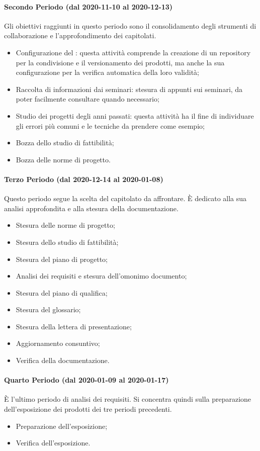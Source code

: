 \paragraph{Secondo Periodo (dal 2020-11-10 al 2020-12-13)}
Gli obiettivi raggiunti in questo periodo sono il consolidamento degli strumenti di collaborazione e l'approfondimento dei capitolati.
\begin{itemize}
	\item Configurazione del : questa attività comprende la creazione di un repository per la condivisione e il versionamento dei prodotti, ma anche la sua configurazione per la verifica automatica della loro validità;
	\item Raccolta di informazioni dai seminari: stesura di appunti sui seminari, da poter facilmente consultare quando necessario;
	\item Studio dei progetti degli anni passati: questa attività ha il fine di individuare gli errori più comuni e le tecniche da prendere come esempio;
	\item Bozza dello studio di fattibilità;
	\item Bozza delle norme di progetto.
\end{itemize}

\paragraph{Terzo Periodo (dal 2020-12-14 al 2020-01-08)}
Questo periodo segue la scelta del capitolato da affrontare. È dedicato alla sua analisi approfondita e alla stesura della documentazione. 
\begin{itemize}
	\item Stesura delle norme di progetto;
	\item Stesura dello studio di fattibilità;
	\item Stesura del piano di progetto;
	\item Analisi dei requisiti e stesura dell'omonimo documento;
	\item Stesura del piano di qualifica;
	\item Stesura del glossario;
	\item Stesura della lettera di presentazione;
	\item Aggiornamento consuntivo;
	\item Verifica della documentazione.
\end{itemize}

\paragraph{Quarto Periodo (dal 2020-01-09 al 2020-01-17)}
È l'ultimo periodo di analisi dei requisiti. Si concentra quindi sulla preparazione dell'esposizione dei prodotti dei tre periodi precedenti.
\begin{itemize}
	\item Preparazione dell'esposizione;
	\item Verifica dell'esposizione.
\end{itemize}


